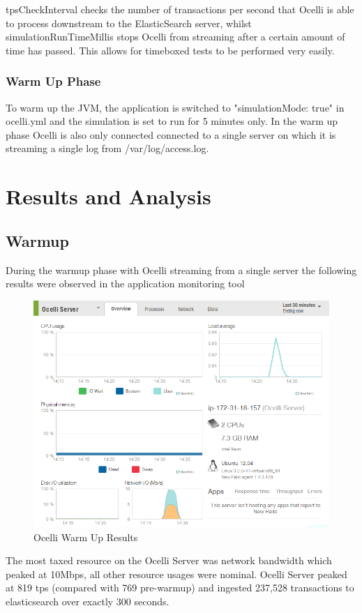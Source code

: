 \documentclass{llncs}
\begin{document}
tpsCheckInterval checks the number of transactions per second that Ocelli is able to process downstream to the ElasticSearch server, whilst simulationRunTimeMillis stops Ocelli from streaming after a certain amount of time has passed. This allows for timeboxed tests to be performed very easily.
\subsubsection{Warm Up Phase}

To warm up the JVM, the application is switched to "simulationMode: true" in ocelli.yml and the simulation is set to run for 5 minutes only. In the warm up phase Ocelli is also only connected connected to a single server on which it is streaming a single log from /var/log/access.log.
\pagebreak
\section{Results and Analysis}
\subsection{Warmup}
During the warmup phase with Ocelli streaming from a single server the following results were observed in the application monitoring tool

\begin{figure}[h]
    \centering
    \includegraphics[scale=0.7]{app4}
    \caption{Ocelli Warm Up Results}
    \label{fig:ocelli_dm}
\end{figure}

The most taxed resource on the Ocelli Server was network bandwidth which peaked at 10Mbps, all other resource usages were nominal. Ocelli Server peaked at 819 tps (compared with 769 pre-warmup) and ingested 237,528 transactions to elasticsearch over exactly 300 seconds.
\end{document}
